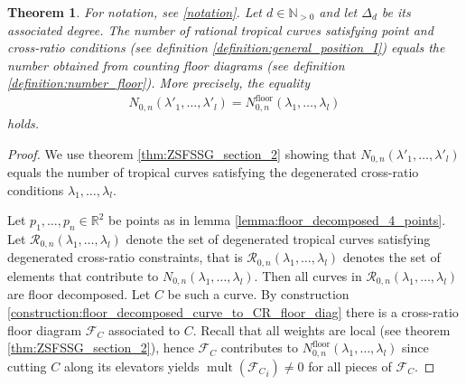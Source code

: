 \documentclass[11pt,reqno,a4]{amsart}
\theoremstyle{dotless}
\newtheorem{theorem}[corollary]{Theorem}
\theoremstyle{definition}
\newcommand{\mult}{\operatorname{mult}}
\begin{document}
\begin{theorem}\label{theorem:CR_count=floor_diag_count}
For notation, see \ref{notation}. Let $d\in\mathbb{N}_{>0}$ and let $\Delta_d$ be its associated degree. The number of rational tropical curves satisfying point and cross-ratio conditions (see definition \ref{definition:general_position_I}) equals the number obtained from counting floor diagrams (see definition \ref{definition:number_floor}). More precisely, the equality
\begin{align*}
N_{0,n}\left(\lambda'_1,\dots,\lambda'_l\right)
=
N_{0,n}^{\textrm{floor}}\left(\lambda_1,\dots,\lambda_l\right)
\end{align*}
holds.
\end{theorem}
\begin{proof}
We use theorem \ref{thm:ZSFSSG_section_2} showing that $N_{0,n}\left(\lambda'_1,\dots,\lambda'_l\right)$ equals the number of tropical curves satisfying the degenerated cross-ratio conditions $\lambda_1,\dots,\lambda_l$.

Let $p_1,\dots,p_n\in\mathbb{R}^2$ be points as in lemma \ref{lemma:floor_decomposed_4_points}. Let $\mathcal{R}_{0,n}\left(\lambda_1,\dots,\lambda_l\right)$ denote the set of degenerated tropical curves satisfying degenerated cross-ratio constraints, that is $\mathcal{R}_{0,n}\left(\lambda_1,\dots,\lambda_l\right)$ denotes the set of elements that contribute to $N_{0,n}\left(\lambda_1,\dots,\lambda_l\right)$.
Then all curves in $\mathcal{R}_{0,n}\left(\lambda_1,\dots,\lambda_l\right)$ are floor decomposed. Let $C$ be such a curve. By construction \ref{construction:floor_decomposed_curve_to_CR_floor_diag} there is a cross-ratio floor diagram $\mathcal{F}_C$ associated to $C$. Recall that all weights are local (see theorem \ref{thm:ZSFSSG_section_2}), hence $\mathcal{F}_C$ contributes to $N_{0,n}^{\textrm{floor}}\left(\lambda_1,\dots,\lambda_l\right)$ since cutting $C$ along its elevators yields $\mult({\mathcal{F}_C}_i)\neq 0$ for all pieces of $\mathcal{F}_C$.


\end{proof}
\end{document}
